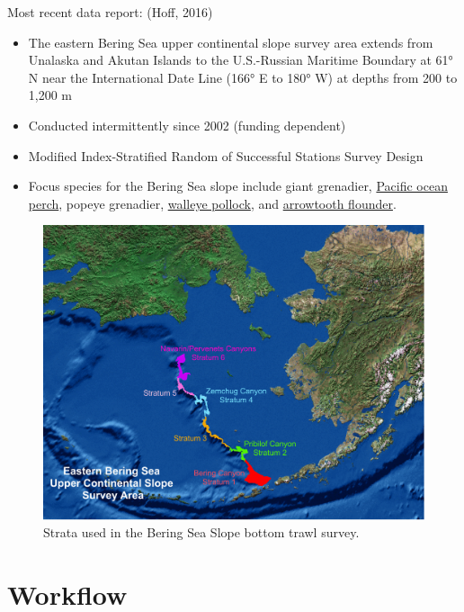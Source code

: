\documentclass[
  letterpaper,
  oneside,
  open=any]{scrbook}
\providecommand{\tightlist}{%
  \setlength{\itemsep}{0pt}\setlength{\parskip}{0pt}}\usepackage{longtable,booktabs,array}
\begin{document}
Most recent data report: (Hoff, 2016)

\begin{itemize}
\tightlist
\item
  The eastern Bering Sea upper continental slope survey area extends
  from Unalaska and Akutan Islands to the U.S.-Russian Maritime Boundary
  at 61° N near the International Date Line (166° E to 180° W) at depths
  from 200 to 1,200 m
\item
  Conducted intermittently since 2002 (funding dependent)
\item
  Modified Index-Stratified Random of Successful Stations Survey Design
\item
  Focus species for the Bering Sea slope include giant grenadier,
  \href{https://www.fisheries.noaa.gov/species/pacific-ocean-perch}{Pacific
  ocean perch}, popeye grenadier,
  \href{https://www.fisheries.noaa.gov/species/alaska-pollock}{walleye
  pollock}, and
  \href{https://www.fisheries.noaa.gov/species/arrowtooth-flounder}{arrowtooth
  flounder}.
\end{itemize}

\begin{figure}

{\centering \includegraphics[width=7.33in,height=\textheight]{content/../img/bss-strata.png}

}

\caption{Strata used in the Bering Sea Slope bottom trawl survey.}

\end{figure}

\hypertarget{workflow}{%
\chapter{Workflow}\label{workflow}}
\end{document}
